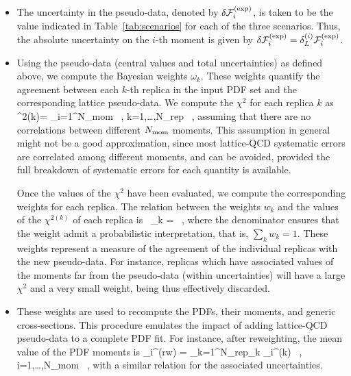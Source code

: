 \begin{itemize}
\item The uncertainty in the pseudo-data, denoted by 
$\delta\mathcal{F}_i^{\rm (exp)} $, is taken to be the value indicated in
Table~\ref{tab:scenarios} for each of the three scenarios.
%
Thus, the absolute uncertainty on the $i$-th moment
is given by 
$\delta\mathcal{F}_i^{\rm (exp)}=\delta_L^{(i)}\mathcal{F}_i^{\rm (exp)} $.

\item Using the pseudo-data (central values and total uncertainties)
as defined above, we compute the Bayesian weights $\omega_k$.
%
These weights quantify the agreement between each $k$-th replica in 
the input PDF set and the corresponding lattice pseudo-data.
%
We compute the $\chi^2$ for each replica $k$ as
\be
\chi^{2(k)}= \sum_{i=1}^{\rm N_{\rm mom}}  \, , \quad k=1,\ldots,N_{\rm rep} \, ,
\ee
assuming that there are no correlations between different $N_{\rm mom}$ moments.
%
This assumption in general might not be a good approximation, since most 
lattice-QCD systematic errors are correlated among different moments, 
and can be avoided, provided the full breakdown of systematic errors 
for each quantity is available.
  
Once the values of the $\chi^2$ have been evaluated,
we compute the corresponding weights for each replica.
%
The relation between the weights $w_k$  and the values of
the $\chi^{2(k)}$ of each replica is~\cite{Ball:2011gg,Ball:2010gb}
\be
\omega_k = \, ,
\ee
where the denominator ensures that the weight admit
a probabilistic interpretation, that is, $\sum_k w_k=1$.
%
These weights represent a measure of the agreement of the individual replicas 
with the new pseudo-data.
%
For instance, replicas which have associated values of the moments far from 
the pseudo-data (within uncertainties) will have a large $\chi^2$ and a 
very small weight, being thus effectively discarded.

\item These weights are used to recompute the PDFs, their moments,
and generic cross-sections.
%
This procedure emulates the
impact of adding lattice-QCD pseudo-data to a complete PDF fit.
%
For instance, after reweighting, the mean value of
the PDF moments is
\be
\label{eq:pseudodatadef1}
_i^{\rm (rw)} = \sum_{k=1}^{N_{\rm rep}}\omega_k
_i^{\rm (k)} \, , \quad i=1,\ldots,N_{\rm mom} \, ,
\ee
with a similar relation for the associated uncertainties.
\end{itemize}

